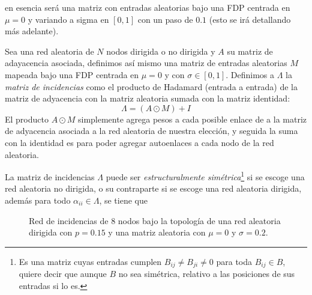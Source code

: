 en esencia será una matriz con entradas aleatorias bajo una FDP centrada en $\mu = 0$ y variando a sigma en $[0,1]$ con un paso de $0.1$ (esto se irá detallando más adelante). 
\begin{definición}
	Sea una red aleatoria de $N$ nodos dirigida o no dirigida y $A$ su matriz de adayacencia asociada, definimos así mismo una matriz de entradas aleatorias $M$ mapeada bajo una FDP centrada en $\mu=0$ y con $\sigma\in[0,1]$. Definimos a $\Lambda$ la \textit{matriz de incidencias} como el producto de Hadamard (entrada a entrada) de la matriz de adyacencia con la matriz aleatoria sumada con la matriz identidad:
	\begin{equation}\label{eqn:MatrizIncidencias}
		\Lambda=(A\odot M) + I
	\end{equation}
	El producto $A\odot M$ simplemente agrega pesos a cada posible enlace de a la matriz de adyacencia asociada a la red aleatoria de nuestra elección, y seguida la suma con la identidad es para poder agregar autoenlaces a cada nodo de la red aleatoria.
\end{definición}
\setlength{\parindent}{0cm}La matriz de incidencias $\Lambda$ puede ser \textit{estructuralmente simétrica}\footnote{Es una matriz cuyas entradas cumplen $B_{ij}\neq B_{ji}\neq 0$ para toda $B_{ij}\in B$, quiere decir que aunque $B$ no sea simétrica, relativo a las posiciones de sus entradas si lo es.} si se escoge una red aleatoria no dirigida, o su contraparte si se escoge una red aleatoria dirigida, además para todo $\alpha_{ii}\in\Lambda$, se tiene que 
\begin{figure} \vspace{-30pt} \begin{center}
		 
	\end{center} 
	\vspace{-52pt} 
	\caption{Red de incidencias de 8 nodos bajo la topología de una red aleatoria dirigida con $p=0.15$ y una matriz aleatoria con $\mu=0$ y $\sigma=0.2$.} 
	\vspace{-10pt}
	\label{fig:RedIncidencias}
\end{figure} 

